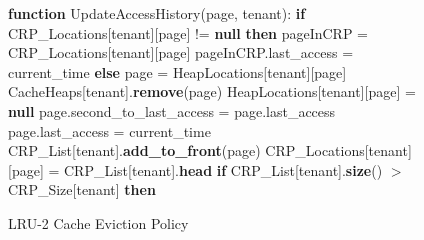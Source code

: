 \begin{figure}[htbp]
    \centering
    \begin{minipage}{\linewidth}
    \begin{algorithm}[H]
        \caption{LRU-2 Cache Eviction Policy}
        \begin{algorithmic}
            \STATE \textbf{function} UpdateAccessHistory(page, tenant):
            \STATE \hspace{\algorithmicindent} \textbf{if} CRP\_Locations[tenant][page] != \textbf{null} \textbf{then}
            \STATE \hspace{\algorithmicindent} \hspace{\algorithmicindent} pageInCRP = CRP\_Locations[tenant][page]
            \STATE \hspace{\algorithmicindent} \hspace{\algorithmicindent} pageInCRP.last\_access = current\_time
            \STATE \hspace{\algorithmicindent} \textbf{else}
            \STATE \hspace{\algorithmicindent} \hspace{\algorithmicindent} page = HeapLocations[tenant][page]
            \STATE \hspace{\algorithmicindent} \hspace{\algorithmicindent} CacheHeaps[tenant].\textbf{remove}(page)
            \STATE \hspace{\algorithmicindent} \hspace{\algorithmicindent} HeapLocations[tenant][page] = \textbf{null}
            \STATE \hspace{\algorithmicindent} \hspace{\algorithmicindent} page.second\_to\_last\_access = page.last\_access
            \STATE \hspace{\algorithmicindent} \hspace{\algorithmicindent} page.last\_access = current\_time
            \STATE \hspace{\algorithmicindent} \hspace{\algorithmicindent} CRP\_List[tenant].\textbf{add\_to\_front}(page)
            \STATE \hspace{\algorithmicindent} \hspace{\algorithmicindent} CRP\_Locations[tenant][page] = CRP\_List[tenant].\textbf{head}
            \STATE \hspace{\algorithmicindent} \hspace{\algorithmicindent} \textbf{if} CRP\_List[tenant].\textbf{size}() $>$ CRP\_Size[tenant] \textbf{then}

\end{algorithmic}
\end{algorithm}
\end{minipage}
\end{figure}
